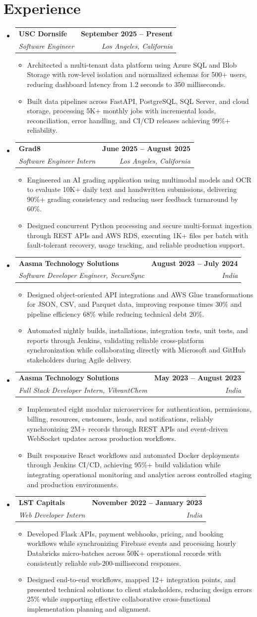 \documentclass[letterpaper,10pt]{article}
\makeatletter
\newcommand{\itemTail}{\vspace{-4pt}}
\newcommand{\sectionGap}{\vspace{-8pt}}
\newcommand{\roleGap}{\vspace{2pt}}
\newcommand{\resumeItem}[1]{\item\small{{#1 \itemTail}}}
\newcommand{\resumeSubheading}[4]{\vspace{-1pt}\item\begin{tabular*}{1.0\textwidth}[t]{l@{\extracolsep{\fill}}r}\textbf{#1} & \textbf{\small #2} \\\textit{\small#3} & \textit{\small #4} \\\end{tabular*}\vspace{-2pt}}
\newcommand{\resumeSubHeadingListStart}{\begin{itemize}[leftmargin=0.0in, label={}]}
\newcommand{\resumeSubHeadingListEnd}{\end{itemize}}
\newcommand{\resumeItemListStart}{\begin{itemize}[leftmargin=0.15in,label=\textbullet,itemsep=3pt,topsep=0pt,parsep=0pt,partopsep=0pt]}
\newcommand{\resumeItemListEnd}{\end{itemize}\vspace{-4pt}}
\makeatother
\begin{document}
\section{Experience}
\resumeSubHeadingListStart
\resumeSubheading{USC Dornsife}{September 2025 -- Present}{Software Engineer}{Los Angeles, California}
\resumeItemListStart
\resumeItem{Architected a multi-tenant data platform using Azure SQL and Blob Storage with row-level isolation and normalized schemas for 500+ users, reducing dashboard latency from 1.2 seconds to 350 milliseconds.}
\resumeItem{Built data pipelines across FastAPI, PostgreSQL, SQL Server, and cloud storage, processing 5K+ monthly jobs with incremental loads, reconciliation, error handling, and CI/CD releases achieving 99\%+ reliability.}
\resumeItemListEnd
\roleGap
\resumeSubheading{Grad8}{June 2025 -- August 2025}{Software Engineer Intern}{Los Angeles, California}
\resumeItemListStart
\resumeItem{Engineered an AI grading application using multimodal models and OCR to evaluate 10K+ daily text and handwritten submissions, delivering 90\%+ grading consistency and reducing user feedback turnaround by 60\%.}
\resumeItem{Designed concurrent Python processing and secure multi-format ingestion through REST APIs and AWS RDS, executing 1K+ files per batch with fault-tolerant recovery, usage tracking, and reliable production support.}
\resumeItemListEnd
\roleGap
\resumeSubheading{Aasma Technology Solutions}{August 2023 -- July 2024}{Software Developer Engineer, SecureSync}{India}
\resumeItemListStart
\resumeItem{Designed object-oriented API integrations and AWS Glue transformations for JSON, CSV, and Parquet data, improving response times 30\% and pipeline efficiency 68\% while reducing technical debt 20\%.}
\resumeItem{Automated nightly builds, installations, integration tests, unit tests, and reports through Jenkins, validating reliable cross-platform synchronization while collaborating directly with Microsoft and GitHub stakeholders during Agile delivery.}
\resumeItemListEnd
\roleGap
\resumeSubheading{Aasma Technology Solutions}{May 2023 -- August 2023}{Full Stack Developer Intern, VibrantChem}{India}
\resumeItemListStart
\resumeItem{Implemented eight modular microservices for authentication, permissions, billing, resources, customers, leads, and notifications, reliably synchronizing 2M+ records through REST APIs and event-driven WebSocket updates across production workflows.}
\resumeItem{Built responsive React workflows and automated Docker deployments through Jenkins CI/CD, achieving 95\%+ build validation while integrating operational monitoring and analytics across controlled staging and production environments.}
\resumeItemListEnd
\roleGap
\resumeSubheading{LST Capitals}{November 2022 -- January 2023}{Web Developer Intern}{India}
\resumeItemListStart
\resumeItem{Developed Flask APIs, payment webhooks, pricing, and booking workflows while synchronizing Firebase events and processing hourly Databricks micro-batches across 50K+ operational records with consistently reliable sub-200-millisecond responses.}
\resumeItem{Designed end-to-end workflows, mapped 12+ integration points, and presented technical solutions to client stakeholders, reducing design errors 25\% while supporting effective collaborative cross-functional implementation planning and alignment.}
\resumeItemListEnd
\resumeSubHeadingListEnd
\sectionGap
\end{document}
